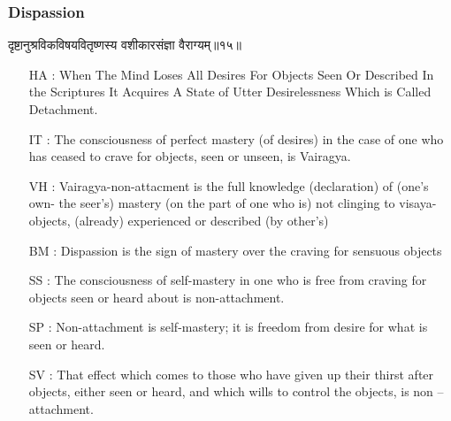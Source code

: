 \begin{frame}[fragile]\frametitle{Dispassion}
\begin{sanskrit}
दृष्टानुश्रविकविषयवितृष्णस्य वशीकारसंज्ञा वैराग्यम्॥१५॥
\end{sanskrit}

	\begin{itemize}
	\item [HA]: When The Mind Loses All Desires For Objects Seen Or Described In the Scriptures It Acquires A State of Utter Desirelessness Which is Called Detachment.
	\item [IT]: The consciousness of perfect mastery (of desires) in the case of one who has ceased to crave for objects, seen or unseen, is Vairagya.
	\item [VH]: Vairagya-non-attacment is the full knowledge (declaration) of (one’s own- the seer’s) mastery (on the part of one who is) not clinging to visaya-objects, (already) experienced or described (by other’s)
	\item [BM]: Dispassion is the sign of mastery over the craving for sensuous objects
	\item [SS]: The consciousness of self-mastery in one who is free from craving for objects seen or heard about is non-attachment.
	\item [SP]: Non-attachment is self-mastery; it is freedom from desire for what is seen or heard.
	\item [SV]: That effect which comes to those who have given up their thirst after objects, either seen or heard, and which wills to control the objects, is non – attachment. 
	\end{itemize}
\end{frame}


